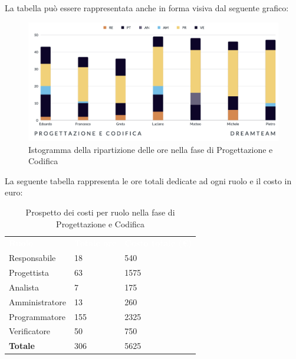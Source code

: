 La tabella può essere rappresentata anche in forma visiva dal seguente grafico:
\begin{figure}[H]
\centering
\includegraphics[scale=0.50]{Sezioni/SezioniPreventivo/grafici/progettazione/Progettazione.png}
\caption{Istogramma della ripartizione delle ore nella fase di Progettazione e Codifica}
\end{figure}

La seguente tabella rappresenta le ore totali dedicate ad ogni ruolo e il costo in euro:

\begin{table}[H]
\begin{center}
\renewcommand{\arraystretch}{1.5}
\begin{tabular}{ m{}<{\centering}  m{}<{\centering} m{}<{\centering}}
	\rowcolor{darkblue}
	\textcolor{white}{\textbf{Ruolo}}&\textcolor{white}{\textbf{Totale ore}}&\textcolor{white}{\textbf{Costo totale (\euro)}}\\ 

	Responsabile & 18 & 540 \\	
	
	Progettista & 63 & 1575 \\
	
	Analista & 7 & 175 \\

	Amministratore & 13 & 260 \\
	
	Programmatore & 155 & 2325 \\
	
	Verificatore & 50 & 750 \\
	
	\textbf{Totale} & 306 & 5625 \\
	
\end{tabular}
\caption{Prospetto dei costi per ruolo nella fase di Progettazione e Codifica}
\end{center}
\end{table}

